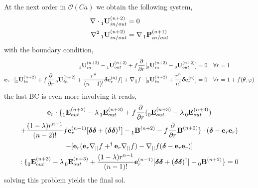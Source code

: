 At the next order in $\mathcal{O}(Ca)$ we obtain the following system, 
\begin{align*}
    \mathbf{\nabla}\cdot \prescript{}{1}{\textbf{U}}_{in/out}^{(n+2)} &= 0 \\
    \mathbf{\nabla}^2\prescript{}{1}{\textbf{U}}_{in/out}^{(n+2)} &= \mathbf{\nabla} \prescript{}{1}{\textbf{P}}_{in/out}^{(n+1)} \\
\end{align*}
with the boundary condition, 
\begin{align}
    \prescript{}{1}{\textbf{U}}_{in}^{(n+2)} - \prescript{}{1}{\textbf{U}}_{out}^{(n+2)}
    + f\frac{\partial}{\partial r} [\prescript{}{0}{\textbf{U}}_{in}^{(n+2)} - \prescript{}{0}{\textbf{U}}_{out}^{(n+2)}]
    &=
    0
    &&\forall r = 1 
    \\
    \textbf{e}_r\cdot [
    \prescript{}{1}{\textbf{U}}_{in}^{(n+2)} 
    + f\frac{\partial}{\partial r}\prescript{}{0}{\textbf{U}}_{in}^{(n+2)} 
    +\frac{r^n}{(n-1)!}\bm\delta \textbf{e}_r^{(n)} f ] 
    + \mathbf{\nabla}_{||} f \cdot [\prescript{}{0}{\textbf{U}}_{in}^{(n+2)} 
    +\frac{r^n}{n!}\bm\delta \textbf{e}_r^{(n)}] &= 0 
    &&\forall r = 1 + f(\theta,\varphi)\\
\end{align}
the last BC is even more involving it reads, 
\begin{multline}
    \textbf{e}_r\cdot \{
        \prescript{}{1}{\textbf{E}}_{out}^{(n+3)}
        -\lambda\prescript{}{1}{\textbf{E}}_{out}^{(n+3)}
        + f \frac{\partial}{\partial r}(\prescript{}{0}{\textbf{E}}_{out}^{(n+3)}
        -\lambda\prescript{}{0}{\textbf{E}}_{out}^{(n+3)})\\
        +\frac{(1-\lambda)r^{n-1}}{(n-2)!}
        f \textbf{e}_r^{(n-1)}[\bm\delta\bm\delta + (\bm\delta\bm\delta)^\dagger]
        - \prescript{}{1}{\textbf{B}}^{(n+2)}
        - f \frac{\partial}{\partial r}\textbf{B}^{(n+2)}
    \}\cdot (\bm\delta - \textbf{e}_r \textbf{e}_r)\\
    - [\textbf{e}_r (\textbf{e}_r \mathbf{\nabla}_{||} f + ^\dagger \textbf{e}_r \mathbf{\nabla}_{||} f) - \mathbf{\nabla}_{||} f (\bm\delta - \textbf{e}_r \textbf{e}_r) ] \\: \{
        \prescript{}{0}{\textbf{E}}_{out}^{(n+3)}
        -\lambda\prescript{}{0}{\textbf{E}}_{out}^{(n+3)}
        +\frac{(1-\lambda)r^{n-1}}{(n-1)!}
        \textbf{e}_r^{(n-1)}[\bm\delta\bm\delta + (\bm\delta\bm\delta)^\dagger]
        - \prescript{}{0}{\textbf{B}}^{(n+2)}
    \} 
    =
    0
\end{multline}
solving this problem yields the final sol. 